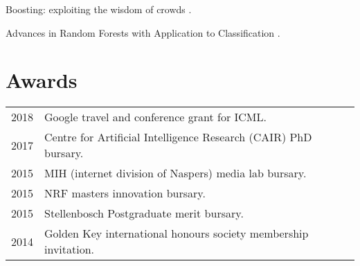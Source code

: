 \documentclass[]{deedy-resume-openfont}
\begin{document}
\begin{minipage}[t]{0.66\textwidth}

\descript{}
\begin{tightemize} 
\item Boosting: exploiting the wisdom of crowds \href{https://drive.google.com/file/d/0B8NUUh-M5neobnJ4STR5Z09VTW8/view?usp=sharing}{\custombold{[link]}}.
\item Advances in Random Forests with Application to Classification \href{https://drive.google.com/file/d/1cpVDxKqjpdR_6IbzviLw-PZh6HkVZwpn/view?usp=sharing}{\custombold{[link]}}.
\end{tightemize}
\sectionsep



\section{Awards} 
\begin{tabular}{rll}
2018		& Google travel and conference grant for ICML.\\
2017		& Centre for Artificial Intelligence Research (CAIR) PhD bursary.\\
2015	    & MIH (internet division of Naspers) media lab bursary.\\
2015	    & NRF masters innovation bursary.\\
2015	    & Stellenbosch Postgraduate merit bursary.\\
2014     	& Golden Key international honours society membership invitation. \\
\end{tabular}
\sectionsep


\end{minipage}
\end{document}
